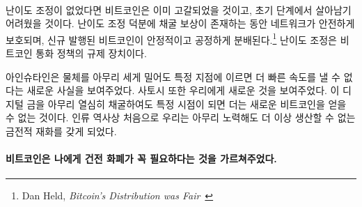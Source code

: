 \paragraph{}
\begin{comment}	
	If it weren't for this difficulty adjustment, all bitcoins would have been mined
	already. If it weren't for this difficulty adjustment, Bitcoin probably wouldn't
	have survived in its infancy. It is what secures the network in its reward era.
	It is what ensures a steady and fair distribution\footnote{Dan Held,
		\textit{Bitcoin's Distribution was Fair}~\cite{distribution-was-fair}} of new
	bitcoin. It is the thermostat which regulates Bitcoin's monetary policy.
\end{comment}
난이도 조정이 없었다면 비트코인은 이미 고갈되었을 것이고, 초기 단계에서 살아남기 어려웠을 것이다.
난이도 조정 덕분에 채굴 보상이 존재하는 동안 네트워크가 안전하게 보호되며,
신규 발행된 비트코인이 안정적이고 공정하게 분배된다.\footnote{Dan Held,
	\textit{Bitcoin’s Distribution was Fair}~\cite{distribution-was-fair}}
난이도 조정은 비트코인 통화 정책의 규제 장치이다.

\begin{comment}	
	Einstein showed us something novel: no matter how hard you push an
	object, at a certain point you won't be able to get more speed out of
	it. Satoshi also showed us something novel: no matter how hard you dig
	for this digital gold, at a certain point you won't be able to get more
	bitcoin out of it. For the first time in human history, we have a
	monetary good which, no matter how hard you try, you won't be able to
	produce more of.
\end{comment}
아인슈타인은 물체를 아무리 세게 밀어도 특정 지점에 이르면 더 빠른 속도를 낼 수 없다는 새로운 사실을 보여주었다. 
사토시 또한 우리에게 새로운 것을 보여주었다. 
이 디지털 금을 아무리 열심히 채굴하여도 특정 시점이 되면 더는 새로운 비트코인을 얻을 수 없는 것이다. 
인류 역사상 처음으로 우리는 아무리 노력해도 더 이상 생산할 수 없는 금전적 재화를 갖게 되었다.

\paragraph{비트코인은 나에게 건전 화폐가 꼭 필요하다는 것을 가르쳐주었다.}

